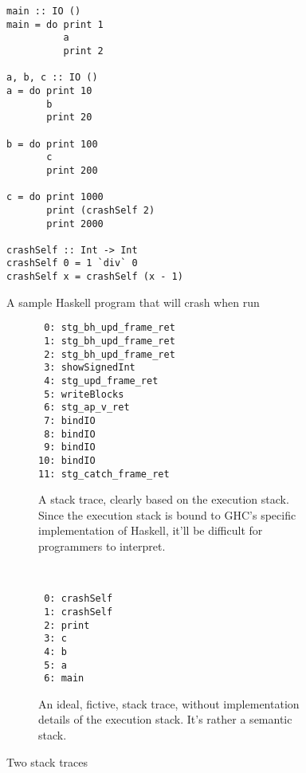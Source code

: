 \begin{figure}
\begin{mdframed}
  \begin{verbatim}
main :: IO ()
main = do print 1
          a
          print 2

a, b, c :: IO ()
a = do print 10
       b
       print 20

b = do print 100
       c
       print 200

c = do print 1000
       print (crashSelf 2)
       print 2000

crashSelf :: Int -> Int
crashSelf 0 = 1 `div` 0
crashSelf x = crashSelf (x - 1)
  \end{verbatim}
  \caption{A sample Haskell program that will crash when run}
  \label{fig:sample_program}
\end{mdframed}
\end{figure}




\begin{figure}
\begin{mdframed}
  \begin{subfigure}[t]{0.5\textwidth}
    {\small
    \begin{verbatim}
 0: stg_bh_upd_frame_ret
 1: stg_bh_upd_frame_ret
 2: stg_bh_upd_frame_ret
 3: showSignedInt
 4: stg_upd_frame_ret
 5: writeBlocks
 6: stg_ap_v_ret
 7: bindIO
 8: bindIO
 9: bindIO
10: bindIO
11: stg_catch_frame_ret
    \end{verbatim}
  }%
    \caption{A stack trace, clearly based on the execution stack. Since the
      execution stack is bound to GHC's specific implementation of Haskell,
      it'll be difficult for programmers to interpret.}
    \label{fig:trace_goal1}
  \end{subfigure}
        ~ %
        \begin{subfigure}[t]{0.5\textwidth}
    {\small
          \begin{verbatim}
 0: crashSelf
 1: crashSelf
 2: print
 3: c
 4: b
 5: a
 6: main
          \end{verbatim}
  }%
          \caption{An ideal, fictive, stack trace, without
          implementation details of the execution stack. It's rather a
          semantic stack.}
          \label{fig:trace_goal2}
        \end{subfigure}
        \caption{Two stack traces
        }\label{fig:traces}
\end{mdframed}
\end{figure}

